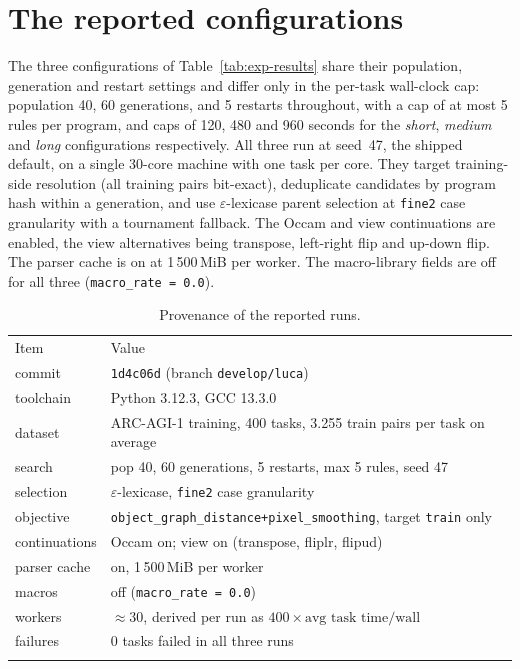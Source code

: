 \section{The reported configurations}
\label{app:repro-configs}

The three configurations of Table~\ref{tab:exp-results} share their population, generation
and restart settings and differ only in the per-task wall-clock cap: population 40, 60
generations, and 5 restarts throughout, with a cap of at most 5 rules per program, and caps
of 120, 480 and 960 seconds for the \emph{short}, \emph{medium} and \emph{long}
configurations respectively. All three run at seed~47, the shipped default, on a single
30-core machine with one task per core. They target training-side resolution (all training
pairs bit-exact), deduplicate candidates by program hash within a generation, and use
$\varepsilon$-lexicase parent selection at \texttt{fine2} case granularity with a tournament
fallback. The Occam and view continuations are enabled, the view alternatives being
transpose, left-right flip and up-down flip. The parser cache is on at 1\,500\,MiB per
worker. The macro-library fields are off for all three (\texttt{macro\_rate = 0.0}).

\begin{table}[htbp]
\centering
\caption{Provenance of the reported runs.}
\label{tab:app-provenance}
\small
\begin{tabular}{p{3.4cm}p{9.4cm}}
\hline\noalign{\smallskip}
Item & Value \\
\noalign{\smallskip}\hline\noalign{\smallskip}
commit & \texttt{1d4c06d} (branch \texttt{develop/luca}) \\
toolchain & Python 3.12.3, GCC 13.3.0 \\
dataset & ARC-AGI-1 training, 400 tasks, 3.255 train pairs per task on average \\
search & pop 40, 60 generations, 5 restarts, max 5 rules, seed 47 \\
selection & $\varepsilon$-lexicase, \texttt{fine2} case granularity \\
objective & \texttt{object\_graph\_distance+pixel\_smoothing}, target \texttt{train} only \\
continuations & Occam on; view on (transpose, fliplr, flipud) \\
parser cache & on, 1\,500\,MiB per worker \\
macros & off (\texttt{macro\_rate = 0.0}) \\
workers & $\approx 30$, derived per run as $400 \times \text{avg task time} / \text{wall}$ \\
failures & 0 tasks failed in all three runs \\
\noalign{\smallskip}\hline
\end{tabular}
\end{table}

